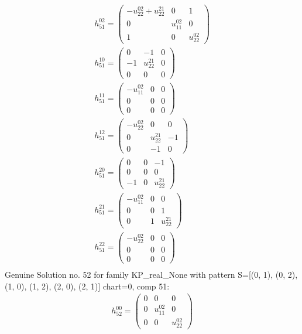 \documentclass[a4paper, 11pt, twoside, onecolumn]{article}
\begin{document}
\begin{landscape}
\begin{gather*}
	 h_{51}^{02}=\begin{pmatrix}- u^{02}_{22} + u^{21}_{22} & 0 & 1\\0 & u^{02}_{11} & 0\\1 & 0 & u^{02}_{22}\end{pmatrix}\\ 
	 h_{51}^{10}=\begin{pmatrix}0 & -1 & 0\\-1 & u^{21}_{22} & 0\\0 & 0 & 0\end{pmatrix}\\ 
	 h_{51}^{11}=\begin{pmatrix}- u^{02}_{11} & 0 & 0\\0 & 0 & 0\\0 & 0 & 0\end{pmatrix}\\ 
	 h_{51}^{12}=\begin{pmatrix}- u^{02}_{22} & 0 & 0\\0 & u^{21}_{22} & -1\\0 & -1 & 0\end{pmatrix}\\ 
	 h_{51}^{20}=\begin{pmatrix}0 & 0 & -1\\0 & 0 & 0\\-1 & 0 & u^{21}_{22}\end{pmatrix}\\ 
	 h_{51}^{21}=\begin{pmatrix}- u^{02}_{11} & 0 & 0\\0 & 0 & 1\\0 & 1 & u^{21}_{22}\end{pmatrix}\\ 
	 h_{51}^{22}=\begin{pmatrix}- u^{02}_{22} & 0 & 0\\0 & 0 & 0\\0 & 0 & 0\end{pmatrix}\\ 
\end{gather*} 
Genuine Solution no. 52 for family KP_real_None with pattern S=[(0, 1), (0, 2), (1, 0), (1, 2), (2, 0), (2, 1)] chart=0, comp 51: 
\begin{gather*} 
	 h_{52}^{00}=\begin{pmatrix}0 & 0 & 0\\0 & u^{02}_{11} & 0\\0 & 0 & u^{02}_{22}\end{pmatrix}\\ 

\end{gather*}
\end{landscape}
\end{document}
